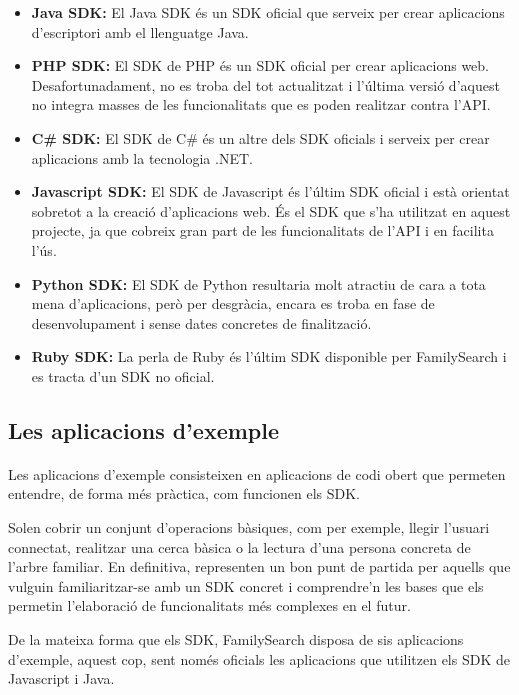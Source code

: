         \begin{itemize}
            \item \textbf{Java SDK:} El Java SDK és un SDK oficial que serveix per crear aplicacions d'escriptori amb el llenguatge Java.
            \item \textbf{PHP SDK:} El SDK de PHP és un SDK oficial per crear aplicacions web. Desafortunadament, no es troba del tot actualitzat i l'última versió d'aquest no integra masses de les funcionalitats que es poden realitzar contra l'API.
            \item \textbf{C\# SDK:} El SDK de C\# és un altre dels SDK oficials i serveix per crear aplicacions amb la tecnologia .NET.
            \item \textbf{Javascript SDK:} El SDK de Javascript és l'últim SDK oficial i està orientat sobretot a la creació d'aplicacions web. És el SDK que s'ha utilitzat en aquest projecte, ja que cobreix gran part de les funcionalitats de l'API i en facilita l'ús.
            \item \textbf{Python SDK:} El SDK de Python resultaria molt atractiu de cara a tota mena d'aplicacions, però per desgràcia, encara es troba en fase de desenvolupament i sense dates concretes de finalització.
            \item \textbf{Ruby SDK:} La perla de Ruby és l'últim SDK disponible per FamilySearch i es tracta d'un SDK no oficial.
        \end{itemize}


    \subsection{Les aplicacions d'exemple}

        \paragraph{}
        Les aplicacions d'exemple consisteixen en aplicacions de codi obert que permeten entendre, de forma més pràctica, com funcionen els SDK.

        Solen cobrir un conjunt d'operacions bàsiques, com per exemple, llegir l'usuari connectat, realitzar una cerca bàsica o la lectura d'una persona concreta de l'arbre familiar. En definitiva, representen un bon punt de partida per aquells que vulguin familiaritzar-se amb un SDK concret i comprendre'n les bases que els permetin l'elaboració de funcionalitats més complexes en el futur.

        De la mateixa forma que els SDK, FamilySearch disposa de sis aplicacions d'exemple, aquest cop, sent només oficials les aplicacions que utilitzen els SDK de Javascript i Java.

